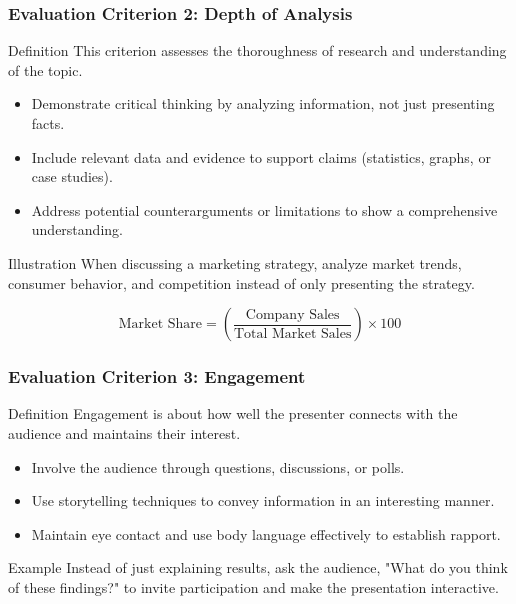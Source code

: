 \documentclass[aspectratio=169]{beamer}
\begin{document}
\begin{frame}[fragile]
    \frametitle{Evaluation Criterion 2: Depth of Analysis}
    \begin{block}{Definition}
        This criterion assesses the thoroughness of research and understanding of the topic.
    \end{block}
    
    \begin{itemize}
        \item Demonstrate critical thinking by analyzing information, not just presenting facts.
        \item Include relevant data and evidence to support claims (statistics, graphs, or case studies).
        \item Address potential counterarguments or limitations to show a comprehensive understanding.
    \end{itemize}

    \begin{block}{Illustration}
        When discussing a marketing strategy, analyze market trends, consumer behavior, 
        and competition instead of only presenting the strategy.
    \end{block}

    \begin{equation}
        \text{Market Share} = \left( \frac{\text{Company Sales}}{\text{Total Market Sales}} \right) \times 100
    \end{equation}
\end{frame}

\begin{frame}[fragile]
    \frametitle{Evaluation Criterion 3: Engagement}
    \begin{block}{Definition}
        Engagement is about how well the presenter connects with the audience and maintains their interest.
    \end{block}
    
    \begin{itemize}
        \item Involve the audience through questions, discussions, or polls.
        \item Use storytelling techniques to convey information in an interesting manner.
        \item Maintain eye contact and use body language effectively to establish rapport.
    \end{itemize}

    \begin{block}{Example}
        Instead of just explaining results, ask the audience, 
        "What do you think of these findings?" to invite participation and make the presentation interactive.
    \end{block}
\end{frame}
\end{document}
